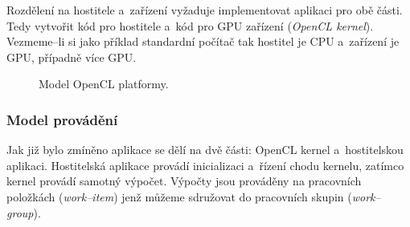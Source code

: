  Rozdělení na hostitele a~zařízení vyžaduje implementovat aplikaci pro obě části. Tedy
vytvořit kód pro hostitele a~kód pro GPU zařízení ({\it OpenCL kernel}). Vezmeme--li si jako
příklad standardní počítač tak hostitel je CPU a~zařízení je GPU, případně více GPU.
\begin{figure}[ht]
    \begin{center}
    \end{center}
    \caption{Model OpenCL platformy. \cite{Khronos:2015}}
    \label{platform}
\end{figure}
\subsubsection{Model provádění}
Jak již bylo zmíněno aplikace se dělí na dvě části: OpenCL kernel a~hostitelskou aplikaci.
Hostitelská aplikace provádí inicializaci a~řízení chodu kernelu, zatímco kernel provádí samotný
výpočet. Výpočty jsou prováděny na pracovních položkách ({\it work--item}) jenž můžeme sdružovat do
pracovních skupin ({\it work--group}).

